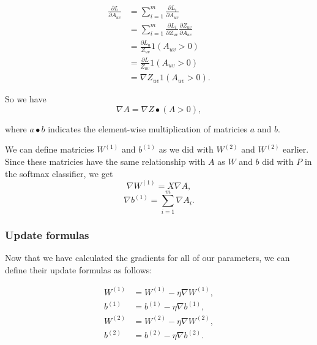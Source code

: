 \begin{align*}
  \frac{\partial L}{\partial A_{uv}}
  &= \sum_{i=1}^m \frac{\partial L_i}{\partial A_{uv}}\\
  &= \sum_{i=1}^m \frac{\partial L_i}{\partial Z_{uv}} \frac{\partial
  Z_{uv}}{\partial A_{uv}}\\
  &= \frac{\partial L_u}{Z_{uv}} 1(A_{uv} > 0)\\
  &= \frac{\partial L}{Z_{uv}} 1(A_{uv} > 0)\\
  &= \nabla Z_{uv} 1(A_{uv} > 0).
\end{align*}

So we have
$$ \nabla A = \nabla Z \bullet (A > 0), $$

where $a \bullet b$ indicates the element-wise multiplication of matricies $a$ and $b$.

We can define matricies $W^{(1)}$ and $b^{(1)}$ as we did with $W^{(2)}$ and
$W^{(2)}$ earlier. Since these matricies have the same relationship with $A$ as
$W$ and $b$ did with $P$ in the softmax classifier, we get
$$ \nabla W^{(1)} = X \nabla A, $$
$$ \nabla b^{(1)} = \sum_{i=1}^m \nabla A_i.$$

\subsubsection{Update formulas}
Now that we have calculated the gradients for all of our parameters, we can
define their update formulas as follows:

\begin{align*}
W^{(1)} &= W^{(1)} - \eta \nabla W^{(1)},\\
b^{(1)} &= b^{(1)} - \eta \nabla b^{(1)},\\
W^{(2)} &= W^{(2)} - \eta \nabla W^{(2)},\\
b^{(2)} &= b^{(2)} - \eta \nabla b^{(2)}.
\end{align*}
